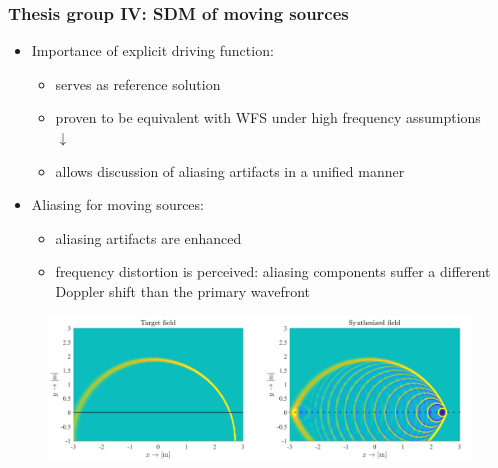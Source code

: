 \documentclass{beamer}
\begin{document}
\begin{frame}
\frametitle{Thesis group IV: SDM of moving sources}
\begin{itemize}
\item Importance of explicit driving function:
	\begin{itemize}
	\item serves as reference solution
	\item proven to be equivalent with WFS under high frequency assumptions
	\\ \hspace{30mm} $\downarrow$ \hspace{10mm} \\
	\item {\color{blue} allows discussion of aliasing artifacts in a unified manner}
	\end{itemize}
	\vspace{2mm}
\item Aliasing for moving sources:
	\begin{itemize}
	\item aliasing artifacts are enhanced
	\item frequency distortion is perceived: aliasing components suffer a different Doppler shift than the primary wavefront
	\end{itemize}
\end{itemize}
\begin{center}\begin{figure} \includegraphics[scale=0.4]{figs/aliasing_artifact.png} \end{figure}\end{center}

\end{frame}
\end{document}
